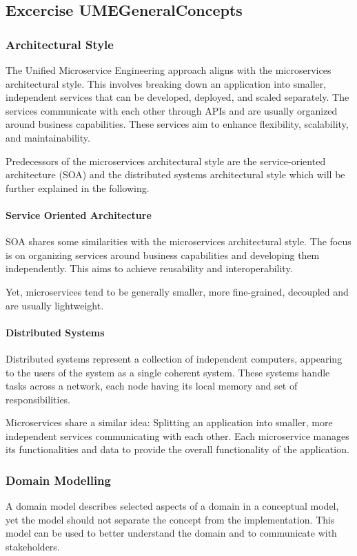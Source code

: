 \subsection{Excercise UMEGeneralConcepts}
\label{sec:ume_general_concepts}
\subsubsection*{Architectural Style}
The Unified Microservice Engineering approach aligns with the microservices architectural style.
This involves breaking down an application into smaller, independent services that can be developed, deployed, and scaled separately.
The services communicate with each other through APIs and are usually organized around business capabilities.
These services aim to enhance flexibility, scalability, and maintainability.

Predecessors of the microservices architectural style are the service-oriented architecture (SOA) and the distributed systems architectural style which will be further explained in the following.

\paragraph*{Service Oriented Architecture}
SOA shares some similarities with the microservices architectural style.
The focus is on organizing services around business capabilities and developing them independently.
This aims to achieve reusability and interoperability.

Yet, microservices tend to be generally smaller, more fine-grained, decoupled and are usually lightweight.

\paragraph*{Distributed Systems}
Distributed systems represent a collection of independent computers, appearing to the users of the system as a single coherent system.
These systems handle tasks across a network, each node having its local memory and set of responsibilities.

Microservices share a similar idea: Splitting an application into smaller, more independent services communicating with each other.
Each microservice manages its functionalities and data to provide the overall functionality of the application.

\subsubsection*{Domain Modelling}
A domain model describes selected aspects of a domain in a conceptual model, yet the model should not separate the concept from the implementation.
This model can be used to better understand the domain and to communicate with stakeholders.

